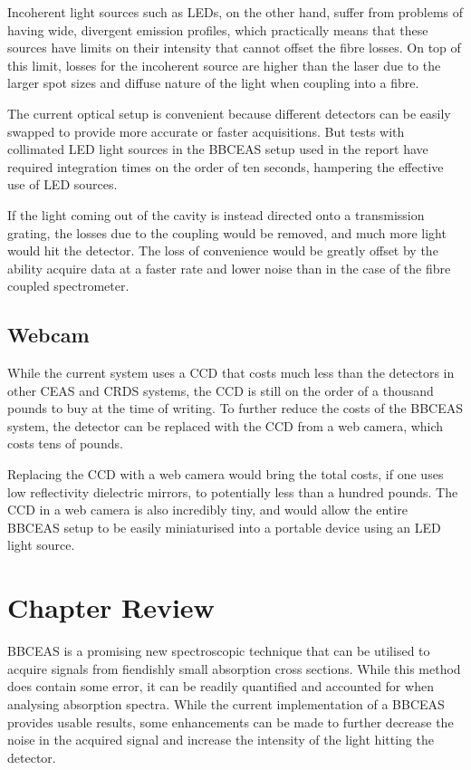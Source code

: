 Incoherent light sources such as \acp{LED}, on the other hand, suffer from
problems of having wide, divergent emission profiles, which practically means
that these sources have limits on their intensity that cannot offset the fibre
losses. On top of this limit, losses for the incoherent source are higher than
the laser due to the larger spot sizes and diffuse nature of the light when
coupling into a fibre.

The current optical setup is convenient because different detectors can be
easily swapped to provide more accurate or faster acquisitions. But tests with
collimated \ac{LED} light sources in the \ac{BBCEAS} setup used in the report
have required integration times on the order of ten seconds, hampering the
effective use of \ac{LED} sources.

If the light coming out of the cavity is instead directed onto a transmission
grating, the losses due to the coupling would be removed, and much more light
would hit the detector. The loss of convenience would be greatly offset by the
ability acquire data at a faster rate and lower noise than in the case of the
fibre coupled spectrometer.



\subsection{Webcam}\label{subsec:bbceas_webcam}

While the current system uses a \ac{CCD} that costs much less than the
detectors in other \ac{CEAS} and \ac{CRDS} systems, the \ac{CCD} is still on
the order of a thousand pounds to buy at the time of writing. To further reduce
the costs of the \ac{BBCEAS} system, the detector can be replaced with the
\ac{CCD} from a web camera, which costs tens of pounds.

Replacing the \ac{CCD} with a web camera would bring the total costs, if one
uses low reflectivity dielectric mirrors, to potentially less than a hundred
pounds. The \ac{CCD} in a web camera is also incredibly tiny, and would allow
the entire \ac{BBCEAS} setup to be easily miniaturised into a portable device
using an \ac{LED} light source.


\section*{Chapter Review}

\ac{BBCEAS} is a promising new spectroscopic technique that can be utilised to
acquire signals from fiendishly small absorption cross sections. While this
method does contain some error, it can be readily quantified and accounted for
when analysing absorption spectra. While the current implementation of a
\ac{BBCEAS} provides usable results, some enhancements can be made to further
decrease the noise in the acquired signal and increase the intensity of the
light hitting the detector.
